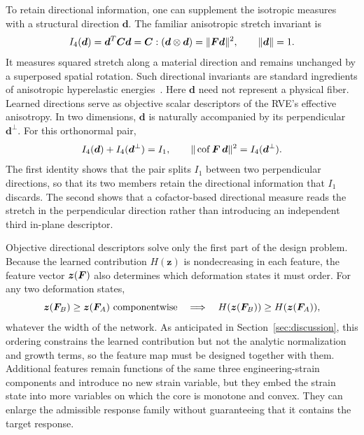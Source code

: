 To retain directional information, one can supplement the isotropic measures with a structural direction $\bm d$. The familiar anisotropic stretch invariant is
\begin{equation}
 I_4(\bm d)=\bm d^T\bm C\bm d
          =\bm C:(\bm d\otimes\bm d)=\|\bm F\bm d\|^2,
 \qquad \|\bm d\|=1.
 \label{eq:directional_invariant}
\end{equation}
It measures squared stretch along a material direction and remains unchanged by a superposed spatial rotation. Such directional invariants are standard ingredients of anisotropic hyperelastic energies~\cite{SchroderNeff2003,Gasser2006}. Here $\bm d$ need not represent a physical fiber. Learned directions serve as objective scalar descriptors of the RVE's effective anisotropy. In two dimensions, $\bm d$ is naturally accompanied by its perpendicular $\bm d^\perp$. For this orthonormal pair,
\begin{equation}
 I_4(\bm d)+I_4(\bm d^\perp)=I_1,\qquad
 \|\operatorname{cof}\bm F\,\bm d\|^2=I_4(\bm d^\perp).
 \label{eq:directional_invariant_2d}
\end{equation}
The first identity shows that the pair splits $I_1$ between two perpendicular directions, so that its two members retain the directional information that $I_1$ discards. The second shows that a cofactor-based directional measure reads the stretch in the perpendicular direction rather than introducing an independent third in-plane descriptor.

Objective directional descriptors solve only the first part of the design problem. Because the learned contribution $H(\bm z)$ is nondecreasing in each feature, the feature vector $\bm z(\bm F)$ also determines which deformation states it must order. For any two deformation states,
\begin{equation}
 \bm z(\bm F_B)\geq\bm z(\bm F_A)\text{ componentwise}
 \quad\Longrightarrow\quad H(\bm z(\bm F_B))\geq H(\bm z(\bm F_A)),
 \label{eq:feature_ordering}
\end{equation}
whatever the width of the network. As anticipated in Section~\ref{sec:discussion}, this ordering constrains the learned contribution but not the analytic normalization and growth terms, so the feature map must be designed together with them. Additional features remain functions of the same three engineering-strain components and introduce no new strain variable, but they embed the strain state into more variables on which the core is monotone and convex. They can enlarge the admissible response family without guaranteeing that it contains the target response.

